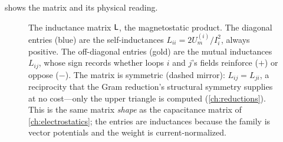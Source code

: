  shows the matrix and its physical reading.

\begin{figure}[t]
\centering
{}
\caption[The inductance matrix]{The inductance matrix $\mathsf{L}$, the magnetostatic
product. The diagonal entries (blue) are the self-inductances $L_{ii}=2U_m^{(i)}/
I_i^2$, always positive. The off-diagonal entries (gold) are the mutual inductances
$L_{ij}$, whose sign records whether loops $i$ and $j$'s fields reinforce
($+$) or oppose ($-$). The matrix is symmetric (dashed mirror): $L_{ij}=L_{ji}$, a
reciprocity that the Gram reduction's structural symmetry supplies at no cost---only
the upper triangle is computed (\cref{ch:reductions}). This is the same matrix
\emph{shape} as the capacitance matrix of \cref{ch:electrostatics}; the entries are
inductances because the family is vector potentials and the weight is
current-normalized.}
\label{fig:Lmatrix}
\end{figure}

